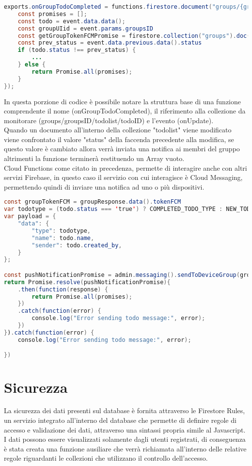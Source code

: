 \begin{lstlisting}[language=java,caption={Funzone Cloud Functions}]
exports.onGroupTodoCompleted = functions.firestore.document("groups/{groupsID}/todolist/{todoID}").onUpdate(event => {
    const promises = [];
    const todo = event.data.data();
    const groupUIid = event.params.groupsID
    const getGroupTokenFCMPromise = firestore.collection("groups").doc(groupUIid).get()
    const prev_status = event.data.previous.data().status
    if (todo.status !== prev_status) {
        ...
    } else {
        return Promise.all(promises);
    }
});
\end{lstlisting}

In questa porzione di codice è possibile notare la struttura base di una funzione comprendente il nome (onGroupTodoCompleted), il riferimento alla collezione da monitorare (groups/{groupsID}/todolist/{todoID}) e l'evento (onUpdate).\\
Quando un documento all'interno della collezione "todolist" viene modificato viene confrontato il valore "status" della faccenda precedente alla modifica, se questo valore è cambiato allora verrà inviata una notifica ai membri del gruppo altrimenti la funzione terminerà restituendo un Array vuoto.\\
Cloud Functions come citato in precedenza, permette di interagire anche con altri servizi Firebase, in questo caso il servizio con cui interagisce è Cloud Messaging, permettendo quindi di inviare una notifica ad uno o più dispositivi.
\begin{lstlisting}[language=java,caption={Funzone Cloud Functions}]
const groupTokenFCM = groupResponse.data().tokenFCM
var todotype = (todo.status === 'true') ? COMPLETED_TODO_TYPE : NEW_TODO_TYPE;
var payload = {
    "data": {
        "type": todotype,
        "name": todo.name,
        "sender": todo.created_by,
    }
};

const pushNotificationPromise = admin.messaging().sendToDeviceGroup(groupTokenFCM, payload)
return Promise.resolve(pushNotificationPromise){
    .then(function(response) {
        return Promise.all(promises);
    })
    .catch(function(error) {
        console.log("Error sending todo message:", error);
    })
}).catch(function(error) {
    console.log("Error sending todo message:", error);

})
\end{lstlisting}


\section{Sicurezza}
La sicurezza dei dati presenti sul database è fornita attraverso le Firestore Rules, un servizio integrato all'interno del database che permette di definire regole di accesso e validazione dei dati, attraverso una sintassi propria simile al Javascript.\\
I dati possono essere visualizzati solamente dagli utenti registrati, di conseguenza è stata creata una funzione ausiliare che verrà richiamata all'interno delle relative regole riguardanti le collezioni che utilizzano il controllo dell'accesso.



